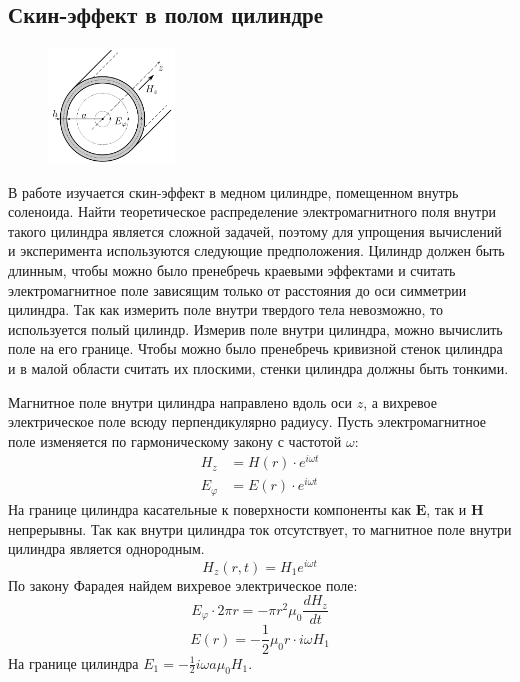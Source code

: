 \subsection*{Скин-эффект в полом цилиндре}

\begin{figure}
	\vspace{-10pt}
	\centering
	\includegraphics[width=0.3\textwidth]{../res/pipe.png}
	\caption{}
	\label{fig:pipe}
\end{figure}

В работе изучается скин-эффект в медном цилиндре, помещенном внутрь соленоида. Найти теоретическое распределение электромагнитного поля внутри такого цилиндра является сложной задачей, поэтому для упрощения вычислений и эксперимента используются следующие предположения. Цилиндр должен быть длинным, чтобы можно было пренебречь краевыми эффектами и считать электромагнитное поле зависящим только от расстояния до оси симметрии цилиндра. Так как измерить поле внутри твердого тела невозможно, то используется полый цилиндр. Измерив поле внутри цилиндра, можно вычислить поле на его границе. Чтобы можно было пренебречь кривизной стенок цилиндра и в малой области считать их плоскими, стенки цилиндра должны быть тонкими.

Магнитное поле внутри цилиндра направлено вдоль оси $z$, а вихревое электрическое поле всюду перпендикулярно радиусу. Пусть электромагнитное поле изменяется по гармоническому закону с частотой $\omega$:
\begin{equation*}
	\begin{split}
		H_z &= H(r) \cdot e^{i\omega t} \\
		E_{\varphi} &= E(r) \cdot e^{i \omega t}
	\end{split}
\end{equation*}
На границе цилиндра касательные к поверхности компоненты как $\pmb{E}$, так и $\pmb{H}$ непрерывны. Так как внутри цилиндра ток отсутствует, то магнитное поле внутри цилиндра является однородным.
$$
H_z(r, t) = H_1 e^{i \omega t}
$$
По закону Фарадея найдем вихревое электрическое поле:
$$
E_{\varphi} \cdot 2\pi r = - \pi r^2 \mu_0 \frac{d H_z}{dt} 
$$
$$
E(r) = -\frac{1}{2} \mu_0 r \cdot i\omega H_1
$$
На границе цилиндра $E_1 = -\frac{1}{2} i \omega a \mu_0 H_1$.

